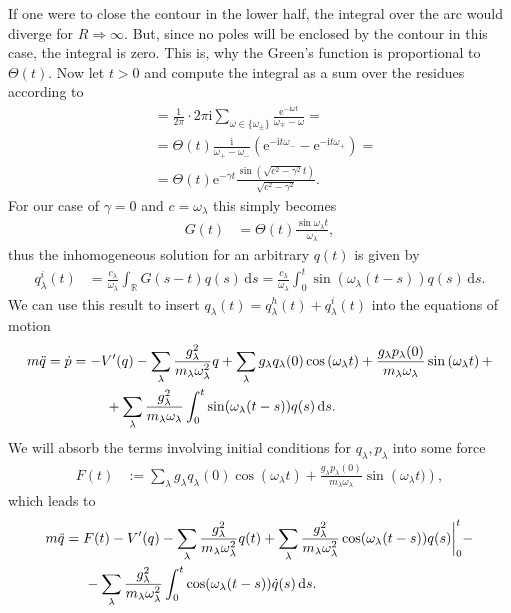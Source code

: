 \documentclass[english, parskip=full]{scrartcl}
\newcommand{\intx}{}
\newcommand{\kla}{}
\renewcommand{\i}{\text{i}}
\newcommand{\e}{\text{e}}
\begin{document}
If one were to close the contour in the lower half, the integral over the arc would diverge for $R\Rightarrow\infty$.
But, since no poles will be enclosed by the contour in this case, the integral is zero. 
This is, why the Green's function is proportional to $\Theta(t)$.
Now let $t>0$ and compute the integral as a sum over the residues according to
\begin{align}
&=\frac{1}{2\pi}\cdot 2\pi\i \sum_{\omega\in\{\omega_\pm\} }\frac{\e^{-\i\omega t}}{\omega_\mp-\omega}=\\
&=\Theta(t)\frac{\i}{\omega_+-\omega_-} \kla\left( \e^{-\i t\omega_- }-\e^{-\i t \omega_+ } \right)=\\
&=\Theta(t)\e^{-\gamma t}\frac{\sin (\sqrt{c^2-\gamma^2} t)}{\sqrt{c^2-\gamma^2}}.
\end{align}
For our case of $\gamma=0$ and $c=\omega_\lambda$ this simply becomes
\begin{align}
G(t)&=\Theta(t)\frac{\sin \omega_\lambda t}{\omega_\lambda},
\end{align}
thus the inhomogeneous solution for an arbitrary $q(t)$ is given by
\begin{align}
q_\lambda^i(t) &= \frac{c_\lambda}{\omega_\lambda}\intx\int_{\mathbb{R}} G(s-t)q(s)\, \mathrm{d}s = \frac{c_\lambda}{\omega_\lambda}\intx\int_{0}^{t}\sin (\omega_\lambda (t-s))q(s)\, \mathrm{d}s.
\end{align}
We can use this result to insert $q_\lambda(t)=q_\lambda^h(t)+q_\lambda^i(t)$ into the equations of motion 
\begin{align}
m\ddot{q}&=\dot{p}=-V'(q)-\sum_\lambda\frac{g_\lambda^2}{m_\lambda\omega_\lambda^2}q+\sum_\lambda g_\lambda q_\lambda(0)\cos\kla\left( \omega_\lambda t \right) + \frac{g_\lambda p_\lambda(0)}{m_\lambda\omega_\lambda} \sin\kla\left( \omega_\lambda t \right) + \\
&\hspace{1.5cm} + \sum_\lambda\frac{g_\lambda^2}{m_\lambda\omega_\lambda} \intx\int_{0}^{t}\sin (\omega_\lambda (t-s))q(s)\, \mathrm{d}s.
\end{align}
We will absorb the terms involving initial conditions for $q_\lambda,p_\lambda$ into some force
\begin{align}
F(t)&:= \sum_\lambda g_\lambda q_\lambda(0)\cos\kla\left( \omega_\lambda t \right) + \frac{g_\lambda p_\lambda(0)}{m_\lambda\omega_\lambda} \sin\kla\left( \omega_\lambda t ) \right),
\end{align}
which leads to
\begin{align}
m\ddot{q}&=F(t)-V'(q) - \sum_\lambda\frac{g_\lambda^2}{m_\lambda\omega_\lambda^2}q(t) + \sum_\lambda\frac{g_\lambda^2}{m_\lambda\omega_\lambda^2}\cos(\omega_\lambda(t-s))q(s)\bigg\vert_0^t - \\
&\hspace{0.5cm} - \sum_\lambda\frac{g_\lambda^2}{m_\lambda\omega_\lambda^2} \intx\int_{0}^{t}\cos (\omega_\lambda (t-s))\dot{q}(s)\, \mathrm{d}s.
\end{align}
\end{document}
